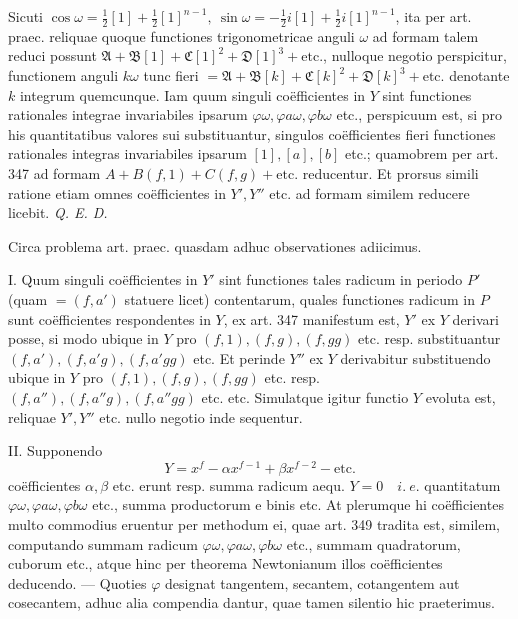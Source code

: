 Sicuti \(\cos\omega=\tfrac12[1]+\tfrac12[1]^{n-1},\allowbreak \ \sin\omega=-\tfrac12i[1]+\tfrac12i[1]^{n-1}\), ita per art. praec. reliquae quoque functiones trigonometricae anguli \(\omega\) ad formam talem reduci possunt \(\mathfrak A+\mathfrak B[1]+\mathfrak C[1]^2+\mathfrak D[1]^3+\text{etc.}\), nulloque negotio perspicitur, functionem anguli \(k\omega\) tunc fieri \(=\mathfrak A+\mathfrak B[k]+\mathfrak C[k]^2+\mathfrak D[k]^3+\text{etc.}\) denotante \(k\) integrum quemcunque. Iam quum singuli coëfficientes in \(Y\) sint functiones rationales integrae invariabiles ipsarum \(\varphi\omega,\allowbreak \varphi a\omega,\allowbreak \varphi b\omega\) etc., perspicuum est, si pro his quantitatibus valores sui substituantur, singulos coëfficientes fieri functiones rationales integras invariabiles ipsarum \([1],\allowbreak [a],\allowbreak [b]\) etc.; quamobrem per art. 347 ad formam \(A+B(f,1)+C(f,g)+\text{etc.}\) reducentur. Et prorsus simili ratione etiam omnes coëfficientes in \(Y',\allowbreak Y''\) etc. ad formam similem reducere licebit. \textit{Q. E. D.}

Circa problema art. praec. quasdam adhuc observationes adiicimus.

I. Quum singuli coëfficientes in \(Y'\) sint functiones tales radicum in periodo \(P'\) (quam \(=(f,a')\) statuere licet) contentarum, quales functiones radicum in \(P\) sunt coëfficientes respondentes in \(Y\), ex art. 347 manifestum est, \(Y'\) ex \(Y\) derivari posse, si modo ubique in \(Y\) pro \((f,1),\allowbreak (f,g),\allowbreak (f,gg)\) etc. resp. substituantur \((f,a'),\allowbreak (f,a'g),\allowbreak (f,a'gg)\) etc. Et perinde \(Y''\) ex \(Y\) derivabitur substituendo ubique in \(Y\) pro \((f,1),\allowbreak (f,g),\allowbreak (f,gg)\) etc. resp. \((f,a''),\allowbreak (f,a''g),\allowbreak (f,a''gg)\) etc. etc. Simulatque igitur functio \(Y\) evoluta est, reliquae \(Y',\allowbreak Y''\) etc. nullo negotio inde sequentur.

II. Supponendo \[Y=x^f-\alpha x^{f-1}+\beta x^{f-2}-\text{etc.}\] coëfficientes \(\alpha,\allowbreak \beta\) etc. erunt resp. summa radicum aequ. \(Y=0\quad i.\ e.\) quantitatum \(\varphi\omega,\allowbreak \varphi a\omega,\allowbreak \varphi b\omega\) etc., summa productorum e binis etc. At plerumque hi coëfficientes multo commodius eruentur per methodum ei, quae art. 349 tradita est, similem, computando summam radicum \(\varphi\omega,\allowbreak \varphi a\omega,\allowbreak \varphi b\omega\) etc., summam quadratorum,
cuborum etc., atque hinc per theorema Newtonianum illos coëfficientes deducendo. — Quoties \(\varphi\) designat tangentem, secantem, cotangentem aut cosecantem, adhuc alia compendia dantur, quae tamen silentio hic praeterimus.

